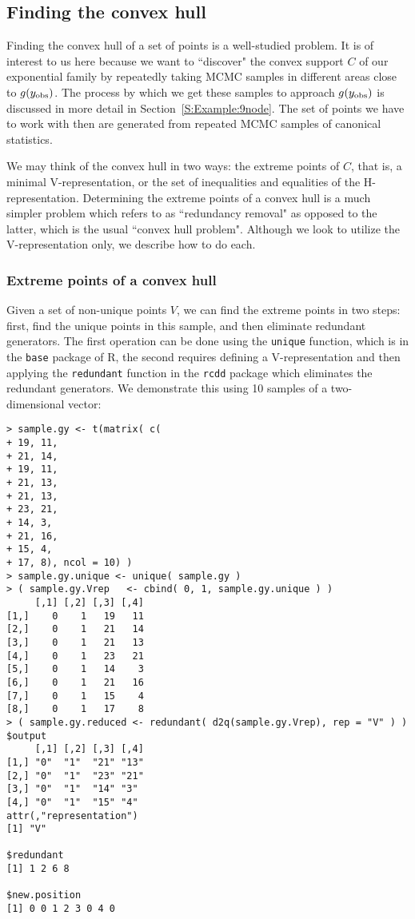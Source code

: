 \subsection{Finding the convex hull}
Finding the convex hull of a set of points is a well-studied problem.  It 
is of interest to us here because we want to ``discover" the convex support $C$
of our exponential family by repeatedly taking MCMC samples in different 
areas close to $g(y_{\text{obs}})$.  The process by which we get these samples 
to approach $g(y_{\text{obs}})$ is discussed in more detail in Section~\ref{S:Example:9node}.  The 
set of points we have to work with then are generated from repeated MCMC
samples of canonical statistics.

We may think of the convex hull in two ways: the extreme points of $C$, that is, 
a minimal V-representation, or the set of inequalities and equalities of the 
H-representation.  Determining the extreme points of a convex hull 
is a much simpler problem which \citet{Fukuda:2004} refers to as ``redundancy 
removal" as opposed to the latter, which is the usual ``convex hull problem".
Although we look to utilize the V-representation only, we describe how to do each.

\subsubsection{Extreme points of a convex hull}
Given a set of non-unique points $V$, we can find the extreme points in two steps:
first, find the unique points in this sample, and then eliminate redundant generators.  The first operation can be done using the \texttt{unique} function, 
which is in the \texttt{base} package of R, the second requires defining a V-representation and then applying the \texttt{redundant} function in the \texttt{rcdd}
package which eliminates the redundant generators.
We demonstrate this using 10 samples of a two-dimensional vector:
{\singlespace \begin{verbatim}
> sample.gy <- t(matrix( c(
+ 19, 11,
+ 21, 14,
+ 19, 11,
+ 21, 13,
+ 21, 13,
+ 23, 21,
+ 14, 3,
+ 21, 16,
+ 15, 4,
+ 17, 8), ncol = 10) )
> sample.gy.unique <- unique( sample.gy ) 
> ( sample.gy.Vrep 	 <- cbind( 0, 1, sample.gy.unique ) )
     [,1] [,2] [,3] [,4]
[1,]    0    1   19   11
[2,]    0    1   21   14
[3,]    0    1   21   13
[4,]    0    1   23   21
[5,]    0    1   14    3
[6,]    0    1   21   16
[7,]    0    1   15    4
[8,]    0    1   17    8
> ( sample.gy.reduced <- redundant( d2q(sample.gy.Vrep), rep = "V" ) )
$output
     [,1] [,2] [,3] [,4]
[1,] "0"  "1"  "21" "13"
[2,] "0"  "1"  "23" "21"
[3,] "0"  "1"  "14" "3" 
[4,] "0"  "1"  "15" "4" 
attr(,"representation")
[1] "V"

$redundant
[1] 1 2 6 8

$new.position
[1] 0 0 1 2 3 0 4 0
\end{verbatim}
}

